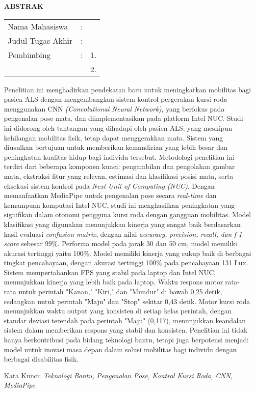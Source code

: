 \begin{center}
  \large\textbf{ABSTRAK}
\end{center}


\vspace{2ex}

\begingroup
\setlength{\tabcolsep}{0pt}

\noindent
\begin{tabularx}{\textwidth}{l >{\centering}m{2em} X}
  Nama Mahasiswa    & : & \name{}         \\

  Judul Tugas Akhir & : & \tatitle{}      \\

  Pembimbing        & : & 1. \advisor{}   \\
                    &   & 2. \coadvisor{} \\
\end{tabularx}
\endgroup

Penelitian ini menghadirkan pendekatan baru untuk meningkatkan mobilitas bagi pasien ALS dengan mengembangkan sistem kontrol pergerakan kursi roda menggunakan CNN \emph{(Convolutional Neural Network)}, yang berfokus pada pengenalan pose mata, dan diimplementasikan pada platform Intel NUC. Studi ini didorong oleh tantangan yang dihadapi oleh pasien ALS, yang meskipun kehilangan mobilitas fisik, tetap dapat menggerakkan mata. Sistem yang diusulkan bertujuan untuk memberikan kemandirian yang lebih besar dan peningkatan kualitas hidup bagi individu tersebut. Metodologi penelitian ini terdiri dari beberapa komponen kunci: pengambilan dan pengolahan gambar mata, ekstraksi fitur yang relevan, estimasi dan klasifikasi posisi mata, serta eksekusi sistem kontrol pada \textit{Next Unit of Computing (NUC)}. Dengan memanfaatkan MediaPipe untuk pengenalan pose secara \emph{real-time} dan kemampuan komputasi Intel NUC, studi ini menghasilkan peningkatan yang signifikan dalam otonomi pengguna kursi roda dengan gangguan mobilitas.  Model klasifikasi yang digunakan menunjukkan kinerja yang sangat baik berdasarkan hasil evaluasi \emph{confusion matrix}, dengan nilai \emph{accuracy, precision, recall, dan f-1 score} sebesar 99\%. Performa model pada jarak 30 dan 50 cm, model memiliki akurasi tertinggi yaitu 100\%. Model memiliki kinerja yang cukup baik di berbagai tingkat pencahayaan, dengan akurasi tertinggi 100\% pada pencahayaan 131 Lux. Sistem mempertahankan FPS yang stabil pada laptop dan Intel NUC, menunjukkan kinerja yang lebih baik pada laptop. Waktu respons motor rata-rata untuk perintah "Kanan," "Kiri," dan "Mundur" di bawah 0,25 detik, sedangkan untuk perintah "Maju" dan "Stop" sekitar 0,43 detik. Motor kursi roda menunjukkan waktu output yang konsisten di setiap kelas perintah, dengan standar deviasi terendah pada perintah "Maju" (0,117), menunjukkan keandalan sistem dalam memberikan respons yang stabil dan konsisten. Penelitian ini tidak hanya berkontribusi pada bidang teknologi bantu, tetapi juga berpotensi menjadi model untuk inovasi masa depan dalam solusi mobilitas bagi individu dengan berbagai disabilitas fisik.

Kata Kunci: \emph{Teknologi Bantu, Pengenalan Pose, Kontrol Kursi Roda, CNN, MediaPipe}